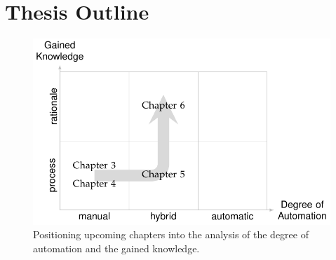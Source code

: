 
\section{Thesis Outline} 

\begin{figure}[!htb]
	\centering
	\includegraphics{work}
	\caption{Positioning upcoming chapters into the analysis of the degree of automation and the gained knowledge.}
	\label{fig:work}
\end{figure}


%
%
%
%
%
%
